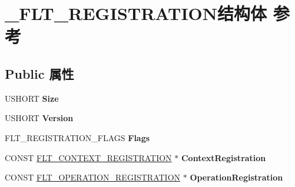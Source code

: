 \hypertarget{struct___f_l_t___r_e_g_i_s_t_r_a_t_i_o_n}{}\section{\+\_\+\+F\+L\+T\+\_\+\+R\+E\+G\+I\+S\+T\+R\+A\+T\+I\+O\+N结构体 参考}
\label{struct___f_l_t___r_e_g_i_s_t_r_a_t_i_o_n}
\subsection*{Public 属性}
\begin{DoxyCompactItemize}
\item 
\mbox{\label{struct___f_l_t___r_e_g_i_s_t_r_a_t_i_o_n_aac6b25be494e6b2996ed49e1f3b42874}} 
U\+S\+H\+O\+RT {\bfseries Size}
\item 
\mbox{\label{struct___f_l_t___r_e_g_i_s_t_r_a_t_i_o_n_af386a5a87747e0df1cd51507d371c365}} 
U\+S\+H\+O\+RT {\bfseries Version}
\item 
\mbox{\label{struct___f_l_t___r_e_g_i_s_t_r_a_t_i_o_n_a812f2409a378e0d05ef3cdcc9a84f5aa}} 
F\+L\+T\+\_\+\+R\+E\+G\+I\+S\+T\+R\+A\+T\+I\+O\+N\+\_\+\+F\+L\+A\+GS {\bfseries Flags}
\item 
\mbox{\label{struct___f_l_t___r_e_g_i_s_t_r_a_t_i_o_n_a983f217d5a79ca62bda362f2dcf92f89}} 
C\+O\+N\+ST \hyperlink{struct___f_l_t___c_o_n_t_e_x_t___r_e_g_i_s_t_r_a_t_i_o_n}{F\+L\+T\+\_\+\+C\+O\+N\+T\+E\+X\+T\+\_\+\+R\+E\+G\+I\+S\+T\+R\+A\+T\+I\+ON} $\ast$ {\bfseries Context\+Registration}
\item 
\mbox{\label{struct___f_l_t___r_e_g_i_s_t_r_a_t_i_o_n_ad53ba561b706c104705a908db4f0a719}} 
C\+O\+N\+ST \hyperlink{struct___f_l_t___o_p_e_r_a_t_i_o_n___r_e_g_i_s_t_r_a_t_i_o_n}{F\+L\+T\+\_\+\+O\+P\+E\+R\+A\+T\+I\+O\+N\+\_\+\+R\+E\+G\+I\+S\+T\+R\+A\+T\+I\+ON} $\ast$ {\bfseries Operation\+Registration}
\item 
\mbox{\label{struct___f_l_t___r_e_g_i_s_t_r_a_t_i_o_n_acd55193cc51f9da481ece082578c266e}} 

\end{DoxyCompactItemize}
